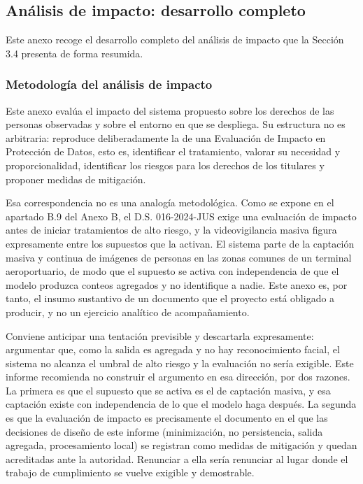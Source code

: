 %
%


\subsection{Análisis de impacto: desarrollo completo}
\label{anx:impacto}

Este anexo recoge el desarrollo completo del análisis de impacto que la
Sección 3.4 presenta de forma resumida.

\subsubsection{Metodología del análisis de impacto}

Este anexo evalúa el impacto del sistema propuesto sobre los derechos de
las personas observadas y sobre el entorno en que se despliega. Su
estructura no es arbitraria: reproduce deliberadamente la de una
Evaluación de Impacto en Protección de Datos, esto es, identificar el
tratamiento, valorar su necesidad y proporcionalidad, identificar los
riesgos para los derechos de los titulares y proponer medidas de
mitigación.

Esa correspondencia no es una analogía metodológica. Como se expone en
el apartado B.9 del Anexo B, el D.S. 016-2024-JUS exige una evaluación
de impacto antes de iniciar tratamientos de alto riesgo, y la
videovigilancia masiva figura expresamente entre los supuestos que la
activan. El sistema parte de la captación masiva y continua de imágenes
de personas en las zonas comunes de un terminal aeroportuario, de modo
que el supuesto se activa con independencia de que el modelo produzca
conteos agregados y no identifique a nadie. Este anexo es, por tanto, el
insumo sustantivo de un documento que el proyecto está obligado a
producir, y no un ejercicio analítico de acompañamiento.

Conviene anticipar una tentación previsible y descartarla expresamente:
argumentar que, como la salida es agregada y no hay reconocimiento
facial, el sistema no alcanza el umbral de alto riesgo y la evaluación
no sería exigible. Este informe recomienda no construir el argumento en
esa dirección, por dos razones. La primera es que el supuesto que se
activa es el de captación masiva, y esa captación existe con
independencia de lo que el modelo haga después. La segunda es que la
evaluación de impacto es precisamente el documento en el que las
decisiones de diseño de este informe (minimización, no persistencia,
salida agregada, procesamiento local) se registran como medidas de
mitigación y quedan acreditadas ante la autoridad. Renunciar a ella
sería renunciar al lugar donde el trabajo de cumplimiento se vuelve
exigible y demostrable.

